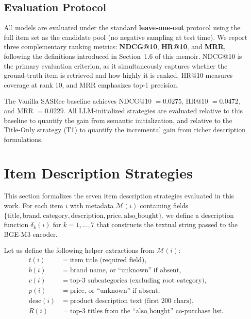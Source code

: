 \documentclass[12pt,a4paper]{report}
\begin{document}
\subsection{Evaluation Protocol}

All models are evaluated under the standard \textbf{leave-one-out}
protocol using the full item set as the candidate pool (no negative
sampling at test time). We report three complementary ranking
metrics: \textbf{NDCG@10}, \textbf{HR@10}, and \textbf{MRR},
following the definitions introduced in Section~1.6 of this memoir.
NDCG@10 is the primary evaluation criterion, as it simultaneously
captures whether the ground-truth item is retrieved and how highly
it is ranked. HR@10 measures coverage at rank 10, and MRR
emphasizes top-1 precision.

The Vanilla SASRec baseline achieves NDCG@10 $= 0.0275$,
HR@10 $= 0.0472$, and MRR $= 0.0229$. All LLM-initialized
strategies are evaluated relative to this baseline to quantify
the gain from semantic initialization, and relative to the
Title-Only strategy (T1) to quantify the incremental gain
from richer description formulations.


\section{Item Description Strategies}
\label{sec:strategies}

This section formalizes the seven item description strategies
evaluated in this work. For each item $i$ with metadata
$\mathcal{M}(i)$ containing fields $\{\text{title},
\text{brand}, \text{category}, \text{description},
\text{price}, \text{also\_bought}\}$, we define a description
function $\delta_k(i)$ for $k = 1, \ldots, 7$ that constructs
the textual string passed to the BGE-M3 encoder.

Let us define the following helper extractions from $\mathcal{M}(i)$:
\begin{align*}
  t(i) &= \text{item title (required field)}, \\
  b(i) &= \text{brand name, or ``unknown'' if absent}, \\
  c(i) &= \text{top-3 subcategories (excluding root category)}, \\
  p(i) &= \text{price, or ``unknown'' if absent}, \\
  \text{desc}(i) &= \text{product description text (first 200 chars)}, \\
  R(i) &= \text{top-3 titles from the ``also\_bought'' co-purchase list}.
\end{align*}
\end{document}

